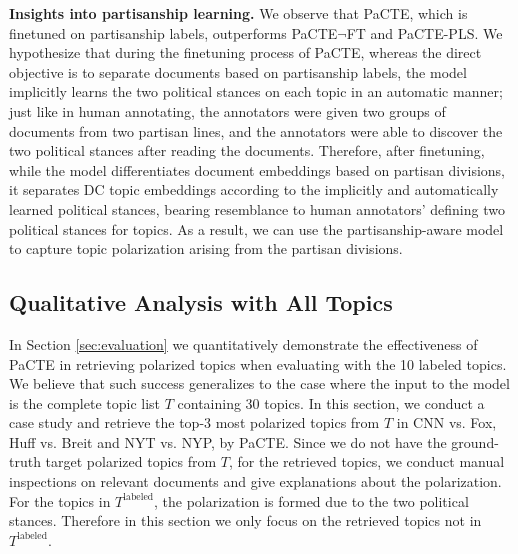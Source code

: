 \documentclass[11pt]{article}
\begin{document}
\textbf{Insights into partisanship learning.} We observe that PaCTE, which is finetuned on partisanship labels, outperforms PaCTE$\neg$FT and PaCTE-PLS. We hypothesize that during the finetuning process of PaCTE, whereas the direct objective is to separate documents based on partisanship labels, the model implicitly learns the two political stances on each topic in an automatic manner; just like in human annotating, the annotators were given two groups of documents from two partisan lines, and the annotators were able to discover the two political stances after reading the documents.
Therefore, after finetuning, while the model differentiates document embeddings based on partisan divisions, it separates DC topic embeddings according to the implicitly and automatically learned political stances, bearing resemblance to human annotators' defining two political stances for topics.  As a result, we can use the partisanship-aware model to capture topic polarization arising from the partisan divisions.

\subsection{Qualitative Analysis with All Topics}
In Section \ref{sec:evaluation} we quantitatively demonstrate the effectiveness of PaCTE in retrieving polarized topics when evaluating with the 10 labeled topics. We believe that such success generalizes to the case where the input to the model is the complete topic list $T$ containing 30 topics.
In this section, we conduct a case study and retrieve the top-3 most polarized topics from $T$ in CNN vs. Fox, Huff vs. Breit and NYT vs. NYP, by PaCTE. Since we do not have the ground-truth target polarized topics from $T$, for the retrieved topics, we conduct manual inspections on relevant documents and give explanations about the polarization. For the topics in $T^\text{labeled}$, the polarization is formed due to the two political stances. Therefore in this section we only focus on the retrieved topics not in $T^\text{labeled}$.

\end{document}
